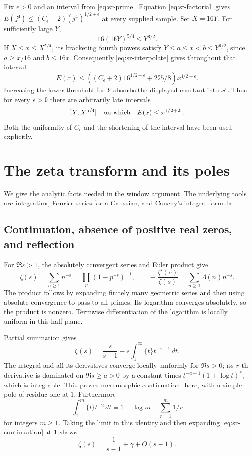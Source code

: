Fix \(\epsilon>0\) and an interval from \eqref{eq:sr-prime}.
Equation \eqref{eq:sr-factorial} gives
\(E(j^4)\leq(C_\epsilon+2)(j^4)^{1/2+\epsilon}\) at every supplied sample.
Set \(X=16Y\). For sufficiently large \(Y\),
\[
 16(16Y)^{5/4}\leq Y^{3/2}.
\]
If \(X\leq x\leq X^{5/4}\), its bracketing fourth powers satisfy
\(Y\leq a\leq x<b\leq Y^{3/2}\), since \(a\geq x/16\) and \(b\leq16x\).
Consequently \eqref{eq:sr-interpolate} gives throughout that interval
\[
 E(x)\leq
 \left((C_\epsilon+2)16^{1/2+\epsilon}+225/8\right)x^{1/2+\epsilon}.
\]
Increasing the lower threshold for \(Y\) absorbs the displayed constant
into \(x^\epsilon\). Thus for every \(\epsilon>0\) there are arbitrarily
late intervals
\begin{equation}\label{eq:sr-continuous}
 [X,X^{5/4}]\quad\hbox{on which}\quad E(x)\leq x^{1/2+2\epsilon}.
\end{equation}
Both the uniformity of \(C_\epsilon\) and the shortening of the interval
have been used explicitly.

\section{The zeta transform and its poles}\label{sec:sr-transform}
We give the analytic facts needed in the window argument. The underlying
tools are integration, Fourier series for a Gaussian, and Cauchy's
integral formula.

\subsection{Continuation, absence of positive real zeros, and reflection}
For \(\Re s>1\), the absolutely convergent series and Euler product give
\[
 \zeta(s)=\sum_{n\geq1}n^{-s}=\prod_p(1-p^{-s})^{-1},\qquad
 -\frac{\zeta'(s)}{\zeta(s)}=\sum_{n\geq1}\Lambda(n)n^{-s}.
\]
The product follows by expanding finitely many geometric series and then
using absolute convergence to pass to all primes. Its logarithm converges
absolutely, so the product is nonzero. Termwise differentiation of the
logarithm is locally uniform in this half-plane.

Partial summation gives
\begin{equation}\label{eq:sr-continuation}
 \zeta(s)=\frac{s}{s-1}
  -s\int_1^\infty \{t\}t^{-s-1}\,dt .
\end{equation}
The integral and all its derivatives converge locally uniformly for
\(\Re s>0\); its \(r\)-th derivative is dominated on
\(\Re s\geq a>0\) by a constant times
\(t^{-a-1}(1+\log t)^r\), which is integrable. This proves meromorphic
continuation there, with a simple pole of residue one at \(1\).
Furthermore
\[
 \int_1^m\{t\}t^{-2}\,dt=1+\log m-\sum_{r=1}^m1/r
\]
for integers \(m\geq1\). Taking the limit in this identity and then
expanding \eqref{eq:sr-continuation} at \(1\) shows
\begin{equation}\label{eq:sr-laurent}
 \zeta(s)=\frac1{s-1}+\gamma+O(s-1).
\end{equation}

